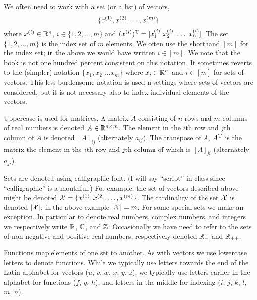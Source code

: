 We often need to work with a set (or a list) of vectors,
\begin{equation*}
\{ x^{(1)}_{}, x^{(2)}_{}, \ldots, x^{(m)}_{}\}
\end{equation*}
where $x^{(i)}_{} \in \mathbb{R}^n$, $i \in \{1, 2, \ldots, m\}$ and
$(\vecx{i})^\trans = [ \vecx[1]{i} \ \vecx[2]{i} \ \ldots \ \vecx[n]{i} ] $.  The
set $\{1, 2, \ldots, m\}$ is the index set of $m$ elements.  We often
use the shorthand $[m]$ for the index set; in the above we would have
written $i \in [m]$.  We note that the book is not one hundred percent
consistent on this notation.  It sometimes reverts to the (simpler)
notation $\{x_1, x_2, \ldots x_m\}$ where $x_i \in \mathbb{R}^n$ and $i
\in [m]$ for sets of vectors.  This less burdensome notation is used n
settings where sets of vectors are considered, but it is not necessary
also to index individual elements of the vectors.

Uppercase is used for matrices.  A matrix $A$ consisting of $n$ rows
and $m$ columns of real numbers is denoted $A \in \mathbb{R}^{n \times
  m}$.  The element in the $i$th row and $j$th column of $A$ is
denoted $[A]_{ij}$ (alternately $a_{ij}$).  The transpose of $A$,
$A^{\rm T}$ is the matrix the element in the $i$th row and $j$th
column of which is $[A]_{ji}$ (alternately $a_{ji}$).

Sets are denoted using calligraphic font.  (I will say ``script'' in
class since ``calligraphic'' is a mouthful.)  For example, the set of
vectors described above might be denoted ${\cal X} = \{ x^{(1)}_{}, x^{(2)}_{},
\ldots, x^{(m)}_{}\}$.  The cardinality of the set ${\cal X}$ is denoted $|{\cal X}|$;
in the above example $|{\cal X}| = m$.  For some special sets we make an
exception.  In particular to denote real numbers, complex numbers, and
integers we respectively write $\mathbb{R}$, $\mathbb{C}$, and $\mathbb{Z}$.
Occasionally we have need to refer to the sets of non-negative and
positive real numbers, respectively denoted $\mathbb{R}_+$ and
$\mathbb{R}_{++}$.

Functions map elements of one set to another.  As with vectors we use
lowercase letters to denote functions.  While we typically use letters
towards the end of the Latin alphabet for vectors ($u$, $v$, $w$, $x$,
$y$, $z$), we typically use letters earlier in the alphabet for
functions ($f$, $g$, $h$), and letters in the middle for indexing
($i$, $j$, $k$, $l$, $m$, $n$).  


